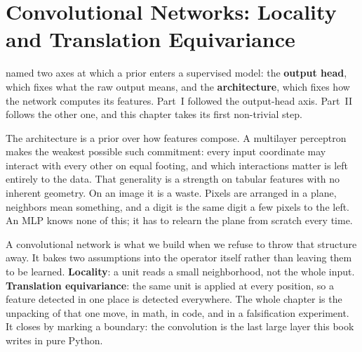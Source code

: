 
\chapter[Convolutional Networks]{Convolutional Networks: Locality and
Translation Equivariance}%
\label{ch:cnn}

 named two axes at which a prior enters a supervised
model: the \textbf{output head}, which fixes what the raw output means,
and the \textbf{architecture}, which fixes how the network computes its
features. Part~I followed the output-head axis. Part~II follows the
other one, and this chapter takes its first non-trivial step.

The architecture is a prior over how features compose. A multilayer
perceptron makes the weakest possible such commitment: every input
coordinate may interact with every other on equal footing, and which
interactions matter is left entirely to the data. That generality is a
strength on tabular features with no inherent geometry. On an image it is
a waste. Pixels are arranged in a plane, neighbors mean something,
and a digit is the same digit a few pixels to the left. An MLP knows none
of this; it has to relearn the plane from scratch every time.

A convolutional network is what we build when we refuse to throw that
structure away. It bakes two assumptions into the operator itself rather
than leaving them to be learned. \textbf{Locality}: a unit reads a small
neighborhood, not the whole input. \textbf{Translation equivariance}: the
same unit is applied at every position, so a feature detected in one place
is detected everywhere. The whole chapter is the unpacking of that one
move, in math, in code, and in a falsification experiment. It closes by
marking a boundary: the convolution is the last large layer this book
writes in pure Python.






